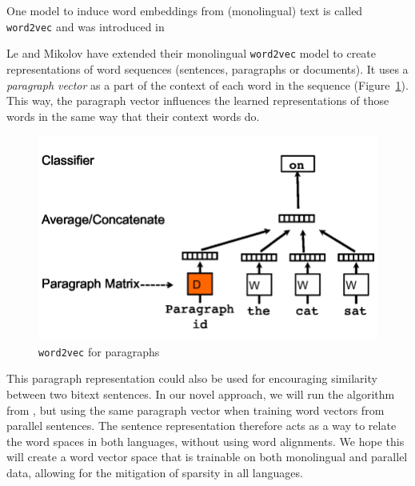 
One model to induce word embeddings from (monolingual) text is called \texttt{word2vec}  and was introduced in %








Le and Mikolov \cite{Le2014} have extended their monolingual \texttt{word2vec} model to create representations of word sequences (sentences, paragraphs or documents).
It uses a \emph{paragraph vector} as a part of the context of each word in the sequence (Figure~\ref{fig:p2v}). 
This way, the paragraph vector influences the learned representations of those words in the same way that their context words do.

\begin{figure}[here]\center
\includegraphics[width=0.7\linewidth]{le.png}
\caption{\texttt{word2vec} for paragraphs}
\label{fig:p2v}
\end{figure}
This paragraph representation could also be used for encouraging similarity between two bitext sentences.
In our novel approach, we will run the algorithm from \cite{Le2014}, but using the same paragraph vector when training word vectors from parallel sentences.
The sentence representation therefore acts as a way to relate the word spaces in both languages, without using word alignments.
We hope this will create a word vector space that is trainable on both monolingual and parallel data, allowing for the mitigation of sparsity in all languages.

